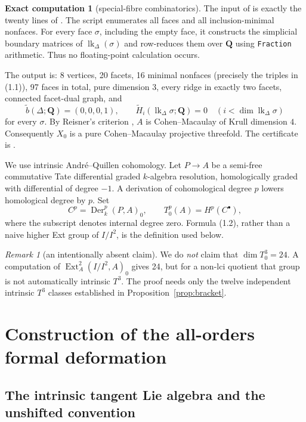 \documentclass[11pt]{article}
\theoremstyle{definition}
\newtheorem{computation}[theorem]{Exact computation}
\theoremstyle{remark}
\newtheorem{remark}[theorem]{Remark}
\newcommand{\QQ}{\mathbf Q}
\newcommand{\Der}{\operatorname{Der}}
\newcommand{\Ext}{\operatorname{Ext}}
\begin{document}
\begin{computation}[special-fibre combinatorics]\label{comp:comb}
The input of  is exactly the twenty
lines of .  The script enumerates all faces
and all inclusion-minimal nonfaces.  For every face $\sigma$, including the
empty face, it constructs the simplicial boundary matrices of
$\operatorname{lk}_\Delta(\sigma)$ and row-reduces them over $\QQ$ using
\texttt{Fraction} arithmetic.  Thus no floating-point calculation occurs.

The output is: 8 vertices, 20 facets, 16 minimal nonfaces (precisely the
triples in (1.1)), 97 faces in total, pure dimension 3, every ridge in exactly
two facets, connected facet-dual graph, and
\[
 \widetilde b(\Delta;\QQ)=(0,0,0,1),\qquad
 \widetilde H_i(\operatorname{lk}_\Delta\sigma;\QQ)=0
 \quad(i<\dim\operatorname{lk}_\Delta\sigma)
\]
for every $\sigma$.  By Reisner's criterion \cite{Reisner}, $A$ is
Cohen--Macaulay of Krull dimension $4$.  Consequently $X_0$ is a pure
Cohen--Macaulay projective threefold.  The certificate is
.
\end{computation}

We use intrinsic Andr\'e--Quillen cohomology.  Let $P\to A$ be a semi-free
commutative Tate differential graded $k$-algebra resolution, homologically
graded with differential of degree $-1$.  A derivation of cohomological degree
$p$ lowers homological degree by $p$.  Set
\[
 C^p=\Der_k^p(P,A)_0,\qquad T^p_0(A)=H^p(C^\bullet),             \tag{1.2}
\]
where the subscript denotes internal degree zero.  Formula (1.2), rather than
a naive higher Ext group of $I/I^2$, is the definition used below.

\begin{remark}[an intentionally absent claim]\label{rem:no-t3dim}
We do \emph{not} claim that $\dim T^3_0=24$.  A computation of
$\Ext_A^2(I/I^2,A)_0$ gives 24, but for a non-lci quotient that group is not
automatically intrinsic $T^3$.  The proof needs only the twelve independent
intrinsic $T^3$ classes established in Proposition~\ref{prop:bracket}.
\end{remark}

\section{Construction of the all-orders formal deformation}

\subsection{The intrinsic tangent Lie algebra and the unshifted convention}
\end{document}
